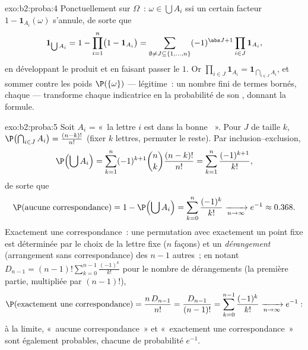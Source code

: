 \begin{solution}{exo:b2:proba:4}
Ponctuellement sur $\Omega$~: $\omega \in \bigcup A_i$ ssi un certain facteur
$1 - \mathbf{1}_{A_i}(\omega)$ s'annule, de sorte que
\[
\mathbf{1}_{\bigcup A_i}
= 1 - \prod_{i=1}^n\bigl(1 - \mathbf{1}_{A_i}\bigr)
= \sum_{\emptyset \neq J \subseteq \{1,\dots,n\}}
(-1)^{\abs J + 1}\prod_{i \in J}\mathbf{1}_{A_i} ,
\]
en développant le produit et en faisant passer le $1$. Or
$\prod_{i\in J}\mathbf{1}_{A_i} = \mathbf{1}_{\bigcap_{i \in J}
A_i}$, et sommer contre les poids $\P(\{\omega\})$ ---
légitime~: un nombre fini de termes bornés, chaque  ---
transforme chaque indicatrice en la probabilité de son , donnant
la formule.
\end{solution}

\begin{solution}{exo:b2:proba:5}
Soit $A_i$ = «~la lettre $i$ est dans la bonne ~». Pour $J$ de
taille $k$, $\P\bigl(\bigcap_{i\in J}A_i\bigr) =
\frac{(n-k)!}{n!}$ (fixer $k$ lettres, permuter le reste). Par
inclusion--exclusion,
\[
\P\Bigl(\bigcup A_i\Bigr)
= \sum_{k=1}^n (-1)^{k+1}\binom nk \frac{(n-k)!}{n!}
= \sum_{k=1}^n \frac{(-1)^{k+1}}{k!} ,
\]
de sorte que
\[
\P(\text{aucune correspondance})
= 1 - \P\Bigl(\bigcup A_i\Bigr)
= \sum_{k=0}^{n}\frac{(-1)^k}{k!}
\xrightarrow[n\to\infty]{} e^{-1} \approx 0.368 .
\]
Exactement une correspondance~: une permutation avec exactement un point fixe est
déterminée par le choix de la lettre fixe ($n$ façons) et un
\emph{dérangement} (arrangement sans correspondance) des $n - 1$ autres~;
en notant $D_{n-1} = (n-1)!\sum_{k=0}^{n-1}\frac{(-1)^k}{k!}$ pour
le nombre de dérangements (la première partie, multipliée par
$(n-1)!$),
\[
\P(\text{exactement une correspondance})
= \frac{n\,D_{n-1}}{n!}
= \frac{D_{n-1}}{(n-1)!}
= \sum_{k=0}^{n-1}\frac{(-1)^k}{k!}
\xrightarrow[n\to\infty]{} e^{-1} :
\]
à la limite, «~aucune correspondance~» et «~exactement une correspondance~» sont également
probables, chacune de probabilité $e^{-1}$.
\end{solution}

